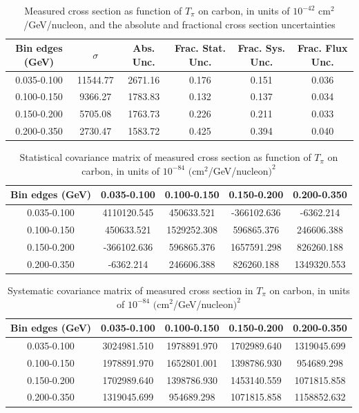 \documentclass[../main.tex]{subfiles}
\begin{document}
\pagebreak
\begin{turnpage}
\end{turnpage}
\begin{table}
  \centering
  \renewcommand{\arraystretch}{1.15}
  \caption{Measured cross section as function of $T_{\pi}$ on carbon, in units of $10^{-42}$ $\text{cm}^2$/GeV/nucleon, and the absolute and fractional cross section uncertainties}
    \begin{tabular}{c||c|c||c|c|c}
      Bin edges (GeV) &  $\sigma$  &  Abs. Unc.  &  Frac. Stat. Unc.  &  Frac. Sys. Unc.  &  Frac. Flux Unc. \\
      \hline
      \hline
      0.035-0.100 & 11544.77 & 2671.16 & 0.176 & 0.151 & 0.036\\
      0.100-0.150 & 9366.27 & 1783.83 & 0.132 & 0.137 & 0.034\\
      0.150-0.200 & 5705.08 & 1763.73 & 0.226 & 0.211 & 0.033\\
      0.200-0.350 & 2730.47 & 1583.72 & 0.425 & 0.394 & 0.040
    \end{tabular}
  \label{tbl:datanucleonnuc6pion_ekina}
\end{table}
\begin{table}
  \centering
  \renewcommand{\arraystretch}{1.15}
  \caption{Statistical covariance matrix of measured cross section as function of $T_{\pi}$ on carbon, in units of $10^{-84}$ $(\text{cm}^2$/GeV/nucleon$)^2$}
    \begin{tabular}{c||cccc}
      Bin edges (GeV) & 0.035-0.100 & 0.100-0.150 & 0.150-0.200 & 0.200-0.350\\
      \hline
      \hline
      0.035-0.100 & 4110120.545 & 450633.521 & -366102.636 & -6362.214\\
      0.100-0.150 & 450633.521 & 1529252.308 & 596865.376 & 246606.388\\
      0.150-0.200 & -366102.636 & 596865.376 & 1657591.298 & 826260.188\\
      0.200-0.350 & -6362.214 & 246606.388 & 826260.188 & 1349320.553
    \end{tabular}
  \label{tbl:statnucleonnuc6pion_ekinb}
\end{table}
\begin{table}
  \centering
  \renewcommand{\arraystretch}{1.15}
  \caption{Systematic covariance matrix of measured cross section in $T_{\pi}$ on carbon, in units of $10^{-84}$ $(\text{cm}^2$/GeV/nucleon$)^2$}
    \begin{tabular}{c||cccc}
      Bin edges (GeV) & 0.035-0.100 & 0.100-0.150 & 0.150-0.200 & 0.200-0.350\\
      \hline
      \hline
      0.035-0.100 & 3024981.510 & 1978891.970 & 1702989.640 & 1319045.699\\
      0.100-0.150 & 1978891.970 & 1652801.001 & 1398786.930 & 954689.298\\
      0.150-0.200 & 1702989.640 & 1398786.930 & 1453140.559 & 1071815.858\\
      0.200-0.350 & 1319045.699 & 954689.298 & 1071815.858 & 1158852.632
    \end{tabular}
  \label{tbl:sysnucleonnuc6pion_ekinc}
\end{table}
\end{document}
